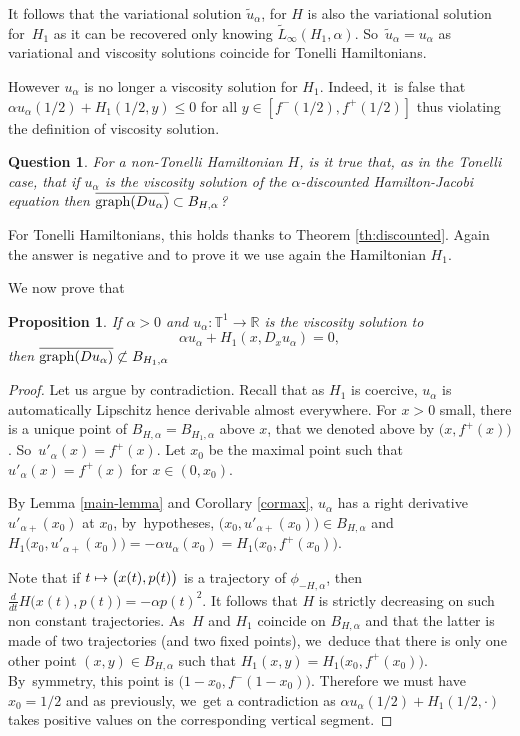 \documentclass[10pt]{amsart}
\newcommand\mto{\mathchoice{\longmapsto}{\mapsto}{\mapsto}{\mapsto}}
\newtheorem{prop}[thm]{Proposition}
\newtheorem{question}{Question}
\theoremstyle{definition}
\newcommand{\R}{\mathbb{R}}
\begin{document}
\begin{appendix}
It follows that the variational solution $\tilde u_\alpha$, for $H$ is also the variational solution for~$H_1$ as it can be recovered only knowing $\widetilde L_\infty(H_1, \alpha)$. So~$\tilde u_\alpha = u_\alpha$ as variational and viscosity solutions coincide for Tonelli Hamiltonians.

However $u_\alpha$ is no longer a viscosity solution for $H_1$. Indeed, it~is false that $\alpha u_\alpha(1/2)+ H_1(1/2,y)\leqslant 0$ for all $y\in [f^-(1/2), f^+(1/2)]$ thus violating the definition of viscosity solution.

\begin{question}\label{quest:2}
For a non-Tonelli Hamiltonian $H$, is it true that, as in the Tonelli case, that if $u_\alpha$ is the viscosity solution of the $\alpha$-discounted Hamilton-Jacobi equation then $\overline{{\rm graph}(Du_\alpha)}\subset B_{H,\alpha}$?
\end{question}

For Tonelli Hamiltonians, this holds thanks to Theorem \ref{th:discounted}. Again the answer is negative and to prove it we use again the Hamiltonian $H_1$.

We now prove that
\begin{prop}\label{A6}
If $\alpha >0$ and $u_\alpha : \mathbb T^1 \to \R$ is the viscosity solution to
\[
\alpha u_\alpha + H_1(x, D_x u_\alpha) =0,
\]
then
$\overline{{\rm graph}(Du_\alpha)}\not\subset B_{H_1,\alpha}$
\end{prop}

\begin{proof}
Let us argue by contradiction. Recall that as $H_1$ is coercive, $u_\alpha$ is automatically Lipschitz hence derivable almost everywhere. For $x>0$ small, there is a unique point of $B_{H,\alpha}=B_{H_1, \alpha}$ above $x$, that we denoted above by $\bigl(x,f^+(x)\bigr)$. So~$u'_\alpha(x) = f^+(x)$. Let $x_0$ be the maximal point such that $u'_\alpha(x) = f^+(x)$ for $x\in (0,x_0)$.

By Lemma \ref{main-lemma} and Corollary \ref{cormax}, $u_\alpha$ has a right derivative $u'_{\alpha+}(x_0) $ at $x_0$, by~hypotheses, $\bigl(x_0,u'_{\alpha+}(x_0)\bigr) \in B_{H,\alpha} $ and $H_1\bigl(x_0,u'_{\alpha+}(x_0)\bigr) =-\alpha u_\alpha(x_0) = H_1\bigl(x_0,f^+(x_0)\bigr)$.

Note that if $t\mto \bigl(x(t),p(t)\bigr)$ is a trajectory of $\phi_{-H, \alpha}$, then $\frac{d}{dt} H\bigl(x(t),p(t)\bigr) = -\alpha p(t)^2$. It follows that $H$ is strictly decreasing on such non constant trajectories. As~$H$ and $H_1$ coincide on $B_{H,\alpha}$ and that the latter is made of two trajectories (and two fixed points), we~deduce that there is only one other point $(x,y) \in B_{H,\alpha}$ such that $H_1(x,y) = H_1\bigl(x_0,f^+(x_0)\bigr)$. By~symmetry, this point is $\bigl(1-x_0, f^-(1-x_0)\bigr)$. Therefore we must have $x_0 = 1/2$ and as previously, we~get a contradiction as $\alpha u_\alpha(1/2) +H_1(1/2,\cdot)$ takes positive values on the corresponding vertical segment.
\end{proof}


\end{appendix}
\end{document}
